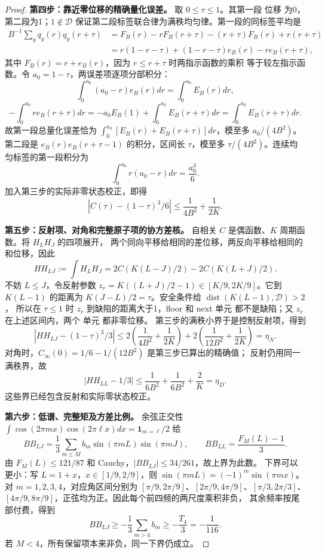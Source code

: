 \documentclass[UTF8,a4paper,11pt,fontset=fandol]{ctexart}
\theoremstyle{remark}
\begin{document}
\begin{proof}
\textbf{第四步：靠近零位移的精确量化误差。}
取 $0\le\tau\le1$。其第一段 位移 为0，第二段为1；$1\notin\mathcal D$
保证第二段标签联合律为满秩均匀律。第一段的同标签平均是
\begin{align*}
 B^{-1}\sum_yq_y(r)q_y(r+\tau)
 &=F_B(r)-rF_B(r+\tau)-(r+\tau)F_B(r)+r(r+\tau)\\
 &=r(1-r-\tau)+(1-r-\tau)e_B(r)-r e_B(r+\tau),
\end{align*}
其中 $F_B(r)=r+e_B(r)$，因为 $r\le r+\tau$ 时两指示函数的乘积
等于较左指示函数。令 $a_0=1-\tau$，两误差项逐项分部积分：
\[
 \int_0^{a_0}(a_0-r)e_B(r)dr=\int_0^{a_0}E_B(r)dr,
\]
\[
 -\int_0^{a_0}r e_B(r+\tau)dr
 =-a_0E_B(1)+\int_0^{a_0}E_B(r+\tau)dr
 =\int_0^{a_0}E_B(r+\tau)dr.
\]
故第一段总量化误差恰为
$\int_0^{a_0}[E_B(r)+E_B(r+\tau)]dr$，模至多 $a_0/(4B^2)$。
第二段是 $e_B(r)e_B(r+\tau-1)$ 的积分，区间长 $\tau$，模至多
$\tau/(4B^2)$。连续均匀标签的第一段积分为
\[
 \int_0^{a_0}r(a_0-r)dr=\frac{a_0^3}{6}.
\]
加入第三步的实际非零状态校正，即得
\[
 |C(\tau)-(1-\tau)^3/6|\le\frac1{4B^2}+\frac1{2K}.
\]

\textbf{第五步：反射项、对角和完整原子项的协方差核。}
自相关 $C$ 是偶函数、$K$ 周期函数。将 $H_LH_J$ 的四项展开，
两个同向平移给相同的差位移，两反向平移给相同的和位移，因此
\[
 HH_{LJ}:=\int H_LH_J
 =2C(K(L-J)/2)-2C(K(L+J)/2).
\]
不妨 $L\le J$，令反射参数
$z_r=K((L+J)/2-1)\in[K/9,2K/9]$。它到 $K(L-1)$ 的距离为
$K(J-L)/2=\tau$。安全条件给 $\operatorname{dist}(K(L-1),\mathcal D)>2$，
所以在 $\tau\le1$ 时 $z_r$ 到缺陷的距离大于1，floor 和 next 单元
都不是缺陷；又 $z_r$ 在上述区间内，两个 单元 都非零位移。
第三步的满秩小界于是控制反射项，得到
\[
 |HH_{LJ}-(1-\tau)^3/3|
 \le2\left(\frac1{4B^2}+\frac1{2K}\right)
 +2\left(\frac1{12B^2}+\frac1{2K}\right)=\eta_N.
\]
对角时，$C_\infty(0)=1/6-1/(12B^2)$ 是第三步已算出的精确值；
反射仍用同一满秩界，故
\[
 |HH_{LL}-1/3|
 \le\frac1{6B^2}+\frac1{6B^2}+\frac2K=\eta_D.
\]
这些界已经包含反射和实际零状态校正。

\textbf{第六步：低谱、完整矩及方差比例。}
余弦正交性 $\int\cos(2\pi mx)\cos(2\pi\ell x)dx=
\mathbf1_{m=\ell}/2$ 给
\[
 BB_{LJ}=\frac13\sum_{m\le M}b_m\sin(\pi mL)\sin(\pi mJ),
 \qquad BB_{LL}=\frac{F_M(L)-1}{3}.
\]
由 $F_M(L)\le121/87$ 和 Cauchy，$|BB_{LJ}|\le34/261$，故上界为此数。
下界可以更小：写 $L=1+x$，$x\in[1/9,2/9]$，则
$\sin(\pi mL)=(-1)^m\sin(\pi mx)$。
对 $m=1,2,3,4$，对应角区间分别为
$[\pi/9,2\pi/9]$、$[2\pi/9,4\pi/9]$、$[\pi/3,2\pi/3]$、
$[4\pi/9,8\pi/9]$，正弦均为正。因此每个前四频的两尺度乘积非负，
其余频率按尾部付费，得到
\[
 BB_{LJ}\ge-\frac13\sum_{m>4}b_m\ge-\frac{T_4}{3}=-\frac1{116}.
\]
若 $M<4$，所有保留项本来非负，同一下界仍成立。


\end{proof}
\end{document}
